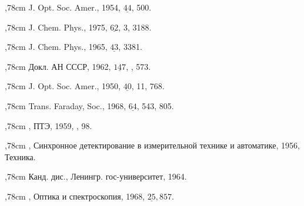 \noindent{},78cm
 J. Opt. Soc. Amer., 1954,
$\underline{44}$, 500.
\vskip 2mm

\noindent{},78cm
 J.
Chem. Phys., 1975, $\underline{62}$, 3, 3188.
\vskip 2mm

\noindent{},78cm
 J. Chem. Phys., 1965,
$\underline{43}$, 3381.
\vskip 2mm

\noindent{},78cm
 Докл. АН СССР,
1962, $\underline{147}$, , 573.
\vskip 2mm

\noindent{},78cm
 J. Opt. Soc. Amer., 1950,
$\underline{40}$, 11, 768.
\vskip 2mm

\noindent{},78cm
 Trans. Faraday, Soc., 1968,
$\underline{64}$, 543, 805.
\vskip 2mm

\noindent{},78cm
, ПТЭ, 1959, , 98.
\vskip 2mm

\noindent{},78cm
, Синхронное детектирование в
измерительной технике и автоматике, 1956,  Техника.
\vskip 2mm

\noindent{},78cm
 Канд. дис., Ленингр.
гос-университет, 1964.
\vskip 2mm

\noindent{},78cm
, Оптика и спектроскопия, 1968,
$\underline{25}, 857.$
\vskip 2mm

